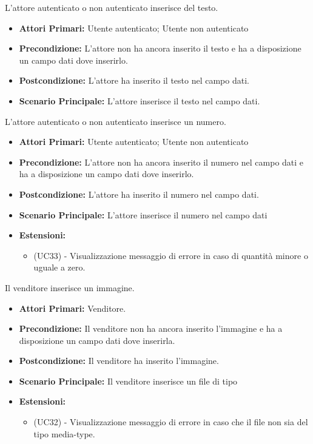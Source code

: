 L'attore autenticato o non autenticato inserisce del testo.
\begin{itemize}
    \item \textbf{Attori Primari:} Utente autenticato; Utente non autenticato
    \item \textbf{Precondizione:} L'attore non ha ancora inserito il testo e ha a disposizione un campo dati dove inserirlo.
    \item \textbf{Postcondizione:} L'attore ha inserito il testo nel campo dati.
    \item \textbf{Scenario Principale:} L'attore inserisce il testo nel campo dati.
\end{itemize}

L'attore autenticato o non autenticato inserisce un numero.
\begin{itemize}
    \item \textbf{Attori Primari:} Utente autenticato; Utente non autenticato
    \item \textbf{Precondizione:} L'attore non ha ancora inserito il numero nel campo dati e ha a disposizione un campo dati dove inserirlo.
    \item \textbf{Postcondizione:} L'attore ha inserito il numero nel campo dati.
    \item \textbf{Scenario Principale:} L'attore inserisce il numero nel campo dati
    \item \textbf{Estensioni:}
    \begin{itemize}
        \item (UC33) - Visualizzazione messaggio di errore in caso di quantità minore o uguale a zero.
    \end{itemize}
\end{itemize}

Il venditore inserisce un immagine.
\begin{itemize}
    \item \textbf{Attori Primari:} Venditore.
    \item \textbf{Precondizione:} Il venditore non ha ancora inserito l'immagine e ha a disposizione un campo dati dove inserirla.
    \item \textbf{Postcondizione:} Il venditore ha inserito l'immagine.
    \item \textbf{Scenario Principale:} Il venditore inserisce un file di tipo 
    \item \textbf{Estensioni:}
    \begin{itemize}
        \item (UC32) - Visualizzazione messaggio di errore in caso che il file non sia del tipo media-type.
    \end{itemize}
\end{itemize}
